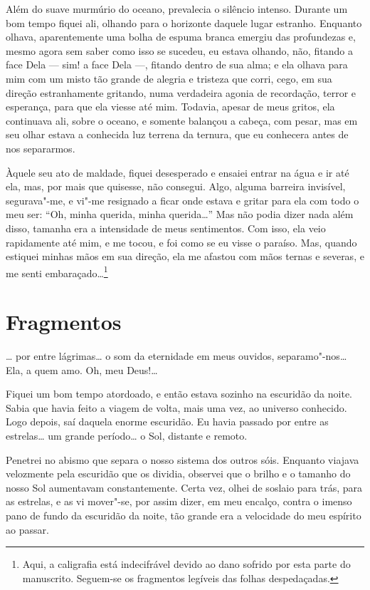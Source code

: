 Além do suave murmúrio do oceano, prevalecia o silêncio intenso. Durante um bom tempo fiquei ali, olhando para o
horizonte daquele lugar estranho. Enquanto olhava, aparentemente uma bolha de espuma branca emergiu das profundezas e,
mesmo agora sem saber como isso se sucedeu, eu estava olhando, não, fitando a face Dela --- sim! a face Dela ---, fitando
dentro de sua alma; e ela olhava para mim com um misto tão grande de alegria e tristeza que corri, cego, em sua
direção estranhamente gritando, numa verdadeira agonia de recordação, terror e esperança, para que ela viesse até mim.
Todavia, apesar de meus gritos, ela continuava ali, sobre o oceano, e somente balançou a cabeça, com pesar, mas em seu
olhar estava a conhecida luz terrena da ternura, que eu conhecera antes de nos separarmos.

Àquele seu ato de maldade, fiquei desesperado e ensaiei entrar na água e ir até ela, mas, por mais que quisesse, não
consegui. Algo, alguma barreira invisível, segurava"-me, e vi"-me resignado a ficar onde estava e gritar para ela com
todo o meu ser: ``Oh, minha querida, minha querida\ldots{}'' Mas não podia dizer nada além disso, tamanha era a intensidade
de meus sentimentos. Com isso, ela veio rapidamente até mim, e me tocou, e foi como se eu visse o paraíso. Mas,
quando estiquei minhas mãos em sua direção, ela me afastou com mãos ternas e severas, e me senti
embaraçado\ldots{}\footnote{ Aqui, a caligrafia está indecifrável devido ao dano sofrido por esta parte do manuscrito. Seguem-se os
fragmentos legíveis das folhas despedaçadas.}

\section{Fragmentos}

\ldots{} por entre lágrimas\ldots{} o som da eternidade em meus ouvidos, separamo"-nos\ldots{} Ela, a quem amo. Oh, meu
Deus!\ldots{}

Fiquei um bom tempo atordoado, e então estava sozinho na escuridão da noite. Sabia que havia feito a viagem de volta,
mais uma vez, ao universo conhecido. Logo depois, saí daquela enorme escuridão. Eu havia passado por entre as
estrelas\ldots{} um grande período\ldots{} o Sol, distante e remoto.

Penetrei no abismo que separa o nosso sistema dos outros sóis. Enquanto viajava velozmente pela escuridão que os
dividia, observei que o brilho e o tamanho do nosso Sol aumentavam constantemente. Certa vez, olhei de soslaio para
trás, para as estrelas, e as vi mover"-se, por assim dizer, em meu encalço, contra o imenso pano de fundo da escuridão
da noite, tão grande era a velocidade do meu espírito ao passar.

